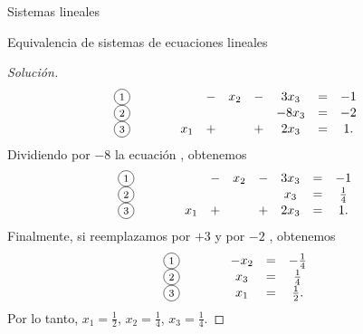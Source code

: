 \begin{chapter}{Sistemas lineales}
\begin{section}{Equivalencia de sistemas de ecuaciones lineales}
\begin{proof}[Solución]
\begin{equation*}
\begin{matrix}
                    \text{\footnotesize\circled{1}}&\qquad&  &-&x_2 &-&3 x_3 &=& -1 \\
                    \text{\footnotesize\circled{2}}&\qquad&  &&  && -8x_3 &=& -2 \\
                    \text{\footnotesize\circled{3}}&\qquad& x_1 &+& &+& 2x_3 &=&   1 .
                    \end{matrix}
                \end{equation*}
                Dividiendo por $-8$ la ecuación  {\footnotesize{}}, obtenemos
                \begin{equation*}
                    \begin{matrix}
                    \text{\footnotesize\circled{1}}&\qquad&  &-&x_2 &-&3 x_3 &=& -1 \\
                    \text{\footnotesize\circled{2}}&\qquad&  &&  && x_3 &=& \frac14 \\
                    \text{\footnotesize\circled{3}}&\qquad& x_1 &+& &+& 2x_3 &=&   1 .
                    \end{matrix}
                \end{equation*} 
                Finalmente, si reemplazamos {\footnotesize{}} por {\footnotesize{}} $+ 3$ {\footnotesize{}} y {\footnotesize{}} por  {\footnotesize{}} $-2$ {\footnotesize{}}, obtenemos 
                \begin{equation*}
                    \begin{matrix}
                    \text{\footnotesize\circled{1}}&\qquad&  -x_2  &=& -\frac14 \\
                    \text{\footnotesize\circled{2}}&\qquad&  x_3 &=& \frac14 \\
                    \text{\footnotesize\circled{3}}&\qquad& x_1  &=&   \frac12 .
                    \end{matrix}
                \end{equation*} 
                Por lo tanto, $x_1 = \frac12$, $x_2 = \frac14$, $x_3 = \frac14$. 
            \end{proof}
            

        \end{section}
        

        
        
\end{chapter}
